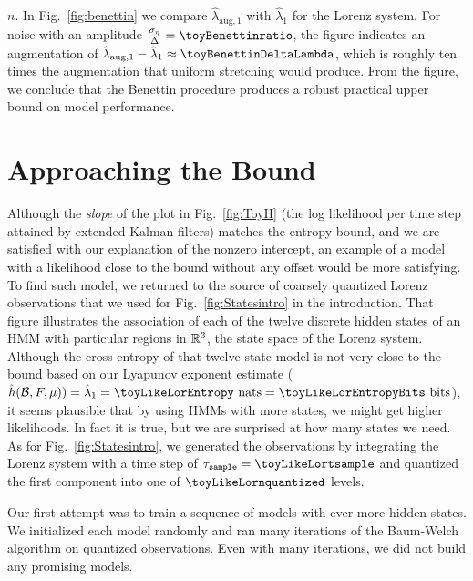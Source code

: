  $n$.  In Fig.~\ref{fig:benettin} we compare
 $\hat \lambda_{\text{aug},1}$ with $\hat \lambda_{1}$ for the Lorenz
 system.  For noise with an amplitude
 $\frac{\sigma_\eta}{\Delta} = \toyBenettinratio$, the figure
 indicates an augmentation of
 $\hat \lambda_{\text{aug},1} - \hat \lambda_{1} \approx
 \toyBenettinDeltaLambda$, which is roughly ten times the augmentation
 that uniform stretching would produce.  From the figure, we conclude
 that the Benettin procedure produces a robust practical upper bound
 on model performance.


\section{Approaching the Bound}
\label{sec:approach}
\longpage%

Although the \emph{slope} of the plot in Fig.~\ref{fig:ToyH} (the log
likelihood per time step attained by extended Kalman filters) matches
the entropy bound, and we are satisfied with our explanation of the
nonzero intercept, an example of a model with a likelihood close to
the bound without any offset would be more satisfying.  To find such
model, we returned to the source of coarsely quantized Lorenz
observations that we used for Fig.~\ref{fig:Statesintro} in the
introduction.  That figure illustrates the association of each of the
twelve discrete hidden states of an HMM with particular regions in
$\mathbb{R}^3$, the state space of the Lorenz system.  Although the cross
entropy of that twelve state model is not very close to the bound
based on our Lyapunov exponent estimate
($\hat h(\mathcal{B},F,\mu)) = \hat \lambda_1 =
\toyLikeLorEntropy~\text{nats} = \toyLikeLorEntropyBits~\text{bits}$),
it seems plausible that by using HMMs with more states, we might get
higher likelihoods.  In fact it is true, but we are surprised at how
many states we need.  As for Fig.~\ref{fig:Statesintro}, we
generated the observations by integrating the Lorenz system with a
time step of $\tau_{\mathtt{sample}}=\toyLikeLortsample$ and quantized
the first component into one of $\toyLikeLornquantized$ levels.

Our first attempt was to train a sequence of models with ever more
hidden states.  We initialized each model randomly and ran many
iterations of the Baum-Welch algorithm on quantized observations.
Even with many iterations, we did not build any promising models.

